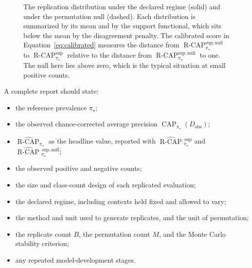 \documentclass[11pt]{article}
\newcommand{\CAP}{\operatorname{CAP}}
\newcommand{\Tpi}{\CAP_{\pi_\star}}
\newcommand{\E}{\mathbb{E}}
\newcommand{\RCAP}{\operatorname{R\text{-}CAP}^{\mathrm{sup}}_{\pi_\star}}
\newcommand{\RCAPHat}{\widehat{\operatorname{R\text{-}CAP}}{}^{\,\mathrm{sup}}_{\pi_\star}}
\newcommand{\RCAPnull}{\operatorname{R\text{-}CAP}^{\mathrm{sup,null}}_{\pi_\star}}
\newcommand{\RCAPnullHat}{\widehat{\operatorname{R\text{-}CAP}}{}^{\,\mathrm{sup,null}}_{\pi_\star}}
\newcommand{\RCAPcalHat}{\widehat{\operatorname{R\text{-}CAP}}_{\pi_\star}}
\theoremstyle{remark}
\begin{document}
\begin{figure}[ht]
\centering
{}
\caption{The replication distribution under the declared regime (solid) and under the permutation null (dashed). Each distribution is summarized by its mean and by the support functional, which sits below the mean by the disagreement penalty. The calibrated score in Equation~\eqref{eq:calibrated} measures the distance from $\RCAPnull$ to $\RCAP$ relative to the distance from $\RCAPnull$ to one. The null here lies above zero, which is the typical situation at small positive counts.}
\label{fig:distribution}
\end{figure}

A complete report should state:
\begin{itemize}
\item the reference prevalence $\pi_\star$;
\item the observed chance-corrected average precision $\Tpi(D_{\mathrm{obs}})$;
\item $\RCAPcalHat$ as the headline value, reported with $\RCAPHat$ and $\RCAPnullHat$;
\item the observed positive and negative counts;
\item the size and class-count design of each replicated evaluation;
\item the declared regime, including contexts held fixed and allowed to vary;
\item the method and unit used to generate replicates, and the unit of permutation;
\item the replicate count $B$, the permutation count $M$, and the Monte Carlo stability criterion;
\item any repeated model-development stages.
\end{itemize}
\end{document}

